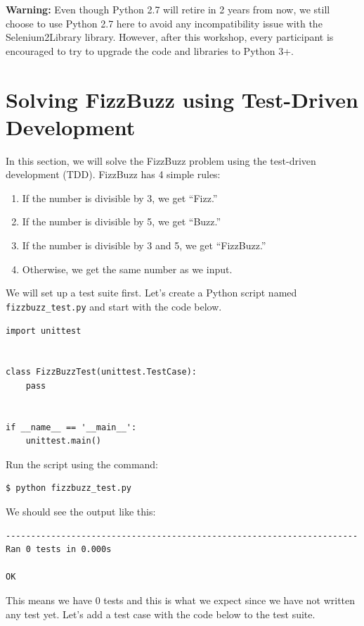 \documentclass{article}
\begin{document}
\noindent \textbf{Warning:} Even though Python 2.7 will retire in 2 years from
now, we still choose to use Python 2.7 here to avoid any incompatibility issue
with the Selenium2Library library. However, after this workshop, every
participant is encouraged to try to upgrade the code and libraries to Python
3+.

\section*{Solving FizzBuzz using Test-Driven Development}

\noindent In this section, we will solve the FizzBuzz problem using the
test-driven development (TDD). FizzBuzz has 4 simple rules:

\begin{enumerate}
  \item If the number is divisible by 3, we get ``Fizz.''
  \item If the number is divisible by 5, we get ``Buzz.''
  \item If the number is divisible by 3 and 5, we get ``FizzBuzz.''
  \item Otherwise, we get the same number as we input.
\end{enumerate}

\noindent We will set up a test suite first. Let's create a Python script named
{\tt fizzbuzz\_test.py} and start with the code below.

\begin{verbatim}
import unittest


class FizzBuzzTest(unittest.TestCase):
    pass


if __name__ == '__main__':
    unittest.main()
\end{verbatim}

\noindent Run the script using the command:

\begin{verbatim}
$ python fizzbuzz_test.py
\end{verbatim}

\noindent We should see the output like this:

\begin{verbatim}
----------------------------------------------------------------------
Ran 0 tests in 0.000s

OK
\end{verbatim}

\noindent This means we have 0 tests and this is what we expect since we have
not written any test yet. Let's add a test case with the code below to the test
suite.
\end{document}
